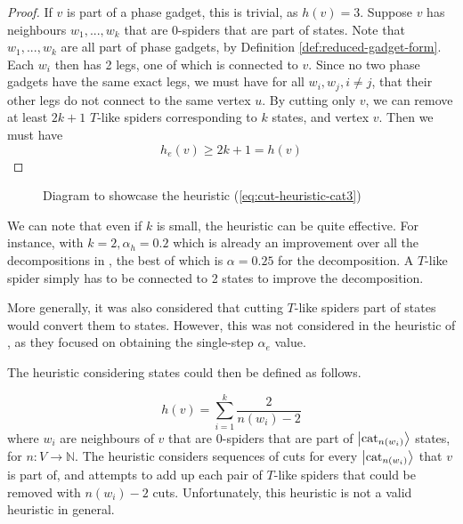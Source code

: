 \begin{proof}
    If $v$ is part of a phase gadget, this is trivial, as $h(v)=3$.
    Suppose $v$ has neighbours $w_1,...,w_k$ that are 0-spiders that are part of  states.
    Note that $w_1,...,w_k$ are all part of phase gadgets, by Definition \ref{def:reduced-gadget-form}.
    Each $w_i$ then has 2 legs, one of which is connected to $v$.
    Since no two phase gadgets have the same exact legs, we must have for all $w_i, w_j, i\neq j$,
    that their other legs do not connect to the same vertex $u$.
    By cutting only $v$, we can remove at least $2k+1$ $T$-like spiders 
    corresponding to $k$  states, and vertex $v$.
    Then we must have
    \begin{equation}
        h_e(v) \geq 2k+1 = h(v)
    \end{equation}
\end{proof}
\begin{figure}[h!]
\caption{Diagram to showcase the heuristic (\ref{eq:cut-heuristic-cat3})}
\end{figure}

We can note that even if $k$ is small, the heuristic can be quite effective.
For instance, with $k=2, \alpha_h = 0.2$ which is already an improvement over
all the  decompositions in \cite{Kissinger2022cat,Kissinger_2022},
the best of which is $\alpha = 0.25$ for the  decomposition.
A $T$-like spider simply has to be connected to 2  states to improve the decomposition.

More generally, it was also considered that cutting $T$-like spiders part of  states
would convert them to  states.
However, this was not considered in the heuristic of \cite{Codsi2022},
as they focused on obtaining the single-step $\alpha_e$ value.

The heuristic considering  states could then be defined as follows.

\begin{equation}
    \label{eq:cut-heuristic-catn}
    h(v) = \sum_{i=1}^k \frac{2}{n(w_i) - 2}
\end{equation}
where $w_i$ are neighbours of $v$ that are 0-spiders that are part of $\left| \text{cat}_{n(w_i)} \right\rangle$ states,
for $n: V \to \mathbb{N}$.
The heuristic considers sequences of cuts for every $\left| \text{cat}_{n(w_i)} \right\rangle$ that $v$ is part of,
and attempts to add up each pair of $T$-like spiders that could be removed with $n(w_i) - 2$ cuts.
Unfortunately, this heuristic is not a valid heuristic in general.

